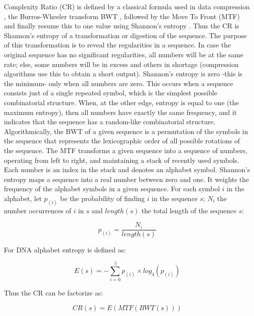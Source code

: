 Complexity Ratio (CR) is defined by a classical formula used in data compression \cite{Adjeroh2008}, the Burros-Wheeler transform BWT \cite{Burrows1994}, followed by the Move To Front (MTF) \cite{Ryabko1980} and finally resume this to one value using Shannon's entropy \cite{Shannon1948}. Thus the CR is Shannon's entropy of a transformation or digestion of the sequence. The purpose of this transformation is to reveal the regularities in a sequence. In case the original sequence has no significant regularities, all numbers will be at the same rate; else, some numbers will be in excess and others in shortage (compression algorithms use this to obtain a short output). Shannon's entropy is zero -this is the minimum- only when all numbers are zero. This occurs when a sequence consists just of a single repeated symbol, which is the simplest possible combinatorial structure. When, at the other edge, entropy is equal to one (the maximum entropy), then all numbers have exactly the same frequency, and it indicates that the sequence has a random-like combinatorial structure. 
Algorithmically, the BWT of a given sequence is a permutation of the symbols in the sequence that represents the lexicographic order of all possible rotations of the sequence. The MTF transforms a given sequence into a sequence of numbers, operating from left to right, and maintaining a stack of recently used symbols. Each number is an index in the stack and denotes an alphabet symbol. Shannon's entropy maps a sequence into a real number between zero and one. It weights the frequency of the alphabet symbols in a given sequence. For each symbol $i$ in the alphabet, let $p_{(i)}$ be the probability of finding $i$ in the sequence $s$; $N_i$ the number occurrences of $i$ in $s$ and $length(s)$ the total length of the sequence $s$: 

\begin{equation} \label{eq:prob_seq}
p_{(i)} = \frac {N_i}{length(s)}
\end{equation}

For DNA alphabet entropy is defined as:

\begin{equation} \label{eq:entropy}
E(s) = -\sum_{i=0}^{\exists}p_{(i)} \times log_4(p_{(i)})
\end{equation}

Thus the CR can be factorize as:

\begin{equation} \label{eq:cr}
CR(s) = E(MTF(BWT(s)))
\end{equation}


